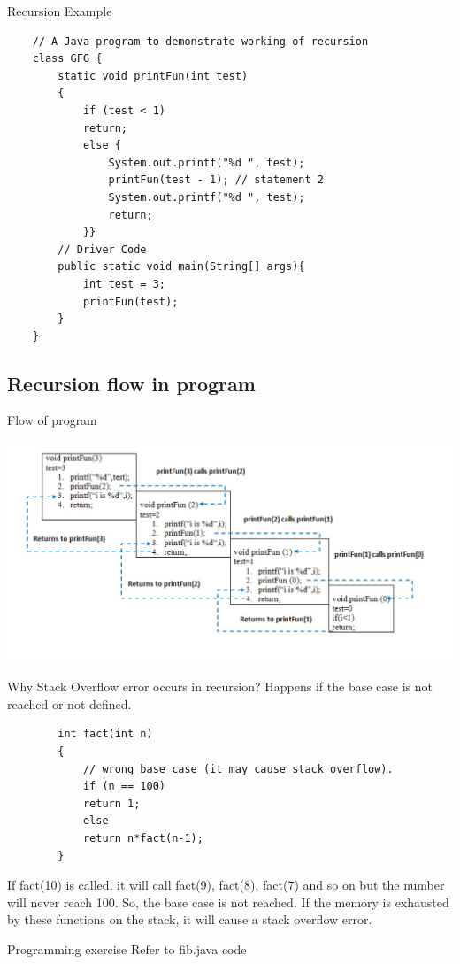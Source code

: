 \begin{frame}[fragile]{Recursion Example}
	\begin{lstlisting} 
	// A Java program to demonstrate working of recursion
	class GFG {
		static void printFun(int test)
		{
			if (test < 1)
			return;
			else {
				System.out.printf("%d ", test);
				printFun(test - 1); // statement 2
				System.out.printf("%d ", test);
				return;
			}}
		// Driver Code
		public static void main(String[] args){
			int test = 3;
			printFun(test);
		}
	}
	\end{lstlisting}
\end{frame}
\subsection{Recursion flow in program}
\begin{frame}[fragile]{Flow of program}
\begin{center}
	\includegraphics[width=\textwidth]{09-scopes_gui/0001.jpg}
\end{center}
\end{frame}

\begin{frame}[fragile]{Why Stack Overflow error occurs in recursion?}
	Happens if the base case is not reached or not defined.
	\begin{lstlisting} 
		int fact(int n)
		{
			// wrong base case (it may cause stack overflow).
			if (n == 100) 
			return 1;
			else
			return n*fact(n-1);
		}
	\end{lstlisting}
	If fact(10) is called, it will call fact(9), fact(8), fact(7) and so on but the number will never reach 100. So, the base case is not reached. If the memory is exhausted by these functions on the stack, it will cause a stack overflow error. 
\end{frame}

\begin{frame}[fragile]{Programming exercise}
	Refer to fib.java code
\end{frame}

